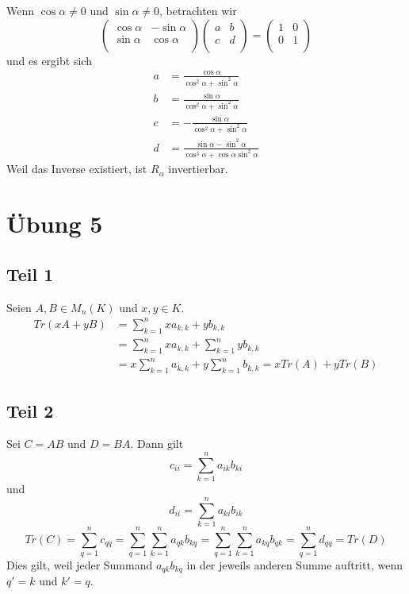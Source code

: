 \documentclass[a4paper,10pt]{article}
\begin{document}
Wenn $\cos \alpha \ne 0$ und $\sin \alpha \ne 0$, betrachten wir
\begin{equation}
 \begin{pmatrix}
  \cos \alpha & -\sin \alpha\\
  \sin \alpha & \cos \alpha\\
 \end{pmatrix}
 \begin{pmatrix}
  a & b\\
  c & d\\
 \end{pmatrix} =
 \begin{pmatrix}
  1 & 0\\
  0 & 1\\
 \end{pmatrix}
\end{equation}
und es ergibt sich
\begin{align*}
 a & = \frac{\cos \alpha}{\cos^2 \alpha + \sin^2 \alpha}\\
 b & = \frac{\sin \alpha}{\cos^2 \alpha + \sin^2 \alpha}\\
 c & = -\frac{\sin \alpha}{\cos^2 \alpha + \sin^2 \alpha}\\
 d & = \frac{\sin \alpha - \sin^2 \alpha}{\cos^3 \alpha + \cos \alpha \sin^2 \alpha}
\end{align*}
Weil das Inverse existiert, ist $R_\alpha$ invertierbar.

\section*{Übung 5}

\subsection*{Teil 1}

Seien $A, B \in M_n(K)$ und $x, y \in K$.
\begin{align*}
 Tr(xA + yB) & = \sum_{k = 1}^n xa_{k,k} + yb_{k,k}\\
 & = \sum_{k = 1}^n xa_{k,k} + \sum_{k = 1}^n yb_{k,k}\\
 & = x\sum_{k = 1}^n a_{k,k} + y\sum_{k = 1}^n b_{k,k} = xTr(A) + yTr(B)
\end{align*}

\subsection*{Teil 2}

Sei $C = AB$ und $D = BA$.
Dann gilt
\begin{equation}
 c_{ii} = \sum_{k = 1}^n a_{ik} b_{ki}
\end{equation}
und
\begin{equation}
 d_{ii} = \sum_{k = 1}^n a_{ki} b_{ik}
\end{equation}
\begin{equation}
 Tr(C) = \sum_{q = 1}^n c_{qq} = \sum_{q = 1}^n \sum_{k = 1}^n a_{qk} b_{kq} = \sum_{q = 1}^n \sum_{k = 1}^n a_{kq} b_{qk} = \sum_{q = 1}^n d_{qq} = Tr(D)
\end{equation}
Dies gilt, weil jeder Summand $a_{qk}b_{kq}$ in der jeweils anderen Summe auftritt, wenn $q' = k$ und $k' = q$.
\end{document}
